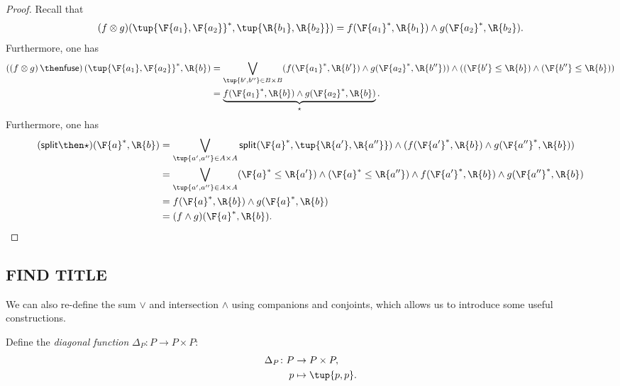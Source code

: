 \begin{proof}
    Recall that 
    \begin{equation}
        (f\otimes g)(\tup{\F{a_1},\F{a_2}}^*,\tup{\R{b_1},\R{b_2}})=f(\F{a_1}^*,\R{b_1})\wedge g(\F{a_2}^*,\R{b_2}).
    \end{equation}
    Furthermore, one has
    \begin{equation}
        \begin{aligned}
            \left(\left(f\otimes g\right) \then \mathsf{fuse}\right)(\tup{\F{a_1},\F{a_2}}^*,\R{b})&=\bigvee_{\tup{b',b''}\in B\times B}(f(\F{a_1}^*,\R{b'})\wedge g(\F{a_2}^*,\R{b''}))\wedge ((\F{b'}\leq \R{b}) \wedge (\F{b''}\leq \R{b}))\\
            &=\underbrace{f(\F{a_1}^*,\R{b})\wedge g(\F{a_2}^*,\R{b})}_{\star}.
        \end{aligned}
    \end{equation}
    Furthermore, one has
    \begin{equation}
        \begin{aligned}
        (\mathsf{split}\then \star)(\F{a}^*,\R{b})&=\bigvee_{\tup{a',a''}\in A\times A} \mathsf{split}(\F{a}^*,\tup{\R{a'},\R{a''}})\wedge (f(\F{a'}^*,\R{b})\wedge g(\F{a''}^*,\R{b}))\\
        &=\bigvee_{\tup{a',a''}\in A\times A}(\F{a}^*\leq \R{a'})\wedge (\F{a}^*\leq \R{a''})\wedge f(\F{a'}^*,\R{b})\wedge g(\F{a''}^*,\R{b})\\
        &=f(\F{a}^*,\R{b})\wedge g(\F{a}^*,\R{b})\\
        &=(f\wedge g)(\F{a}^*,\R{b}).
        \end{aligned}
    \end{equation}
\end{proof}

\subsection{FIND TITLE}

We can also re-define the sum $\vee$ and intersection $\wedge$ using companions and conjoints, which allows us to introduce some useful constructions.

\begin{definition}
Define the \emph{diagonal function} $\Delta_P\colon P \to P \times P$:
\begin{equation}
\begin{aligned}
    \Delta_P \colon P & \to P \times P, \\
             p & \mapsto \tup{p, p}.
\end{aligned}
\end{equation}
\end{definition}

